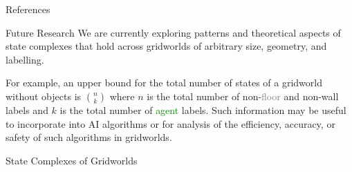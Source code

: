 \documentclass[
    a0paper, %
    portrait, %
    fontscale=0.4 %
    ]{baposter}
\begin{document}
\begin{poster}
\begin{posterbox}[
    name = references,  %
    column = 2, %
    below = message %
    ]{References}
\vspace{1em}
\renewcommand{\section}[2]{} %
\nocite{*} %

\vspace{1em}
\end{posterbox}

\begin{posterbox}[
    name = future,  %
    column = 2, %
    below = references, %
    bottomaligned = sc
    ]{Future Research}
We are currently exploring patterns and theoretical aspects of state complexes that hold across gridworlds of arbitrary size, geometry, and labelling. 

For example, an upper bound for the total number of states of a gridworld without objects is $\binom{n}{k}$ where $n$ is the total number of non-\textcolor{gray}{floor} and non-wall labels and $k$ is the total number of \textcolor{green}{agent} labels. Such information may be useful to incorporate into AI algorithms or for analysis of the efficiency, accuracy, or safety of such algorithms in gridworlds.
\end{posterbox}


\begin{posterbox}[
    name = scgrid,  %
    column = 1, %
    span = 2,
    below = sc %
    ]{State Complexes of Gridworlds}
\begin{center}
    \end{center}


\end{posterbox}
\end{poster}
\end{document}
